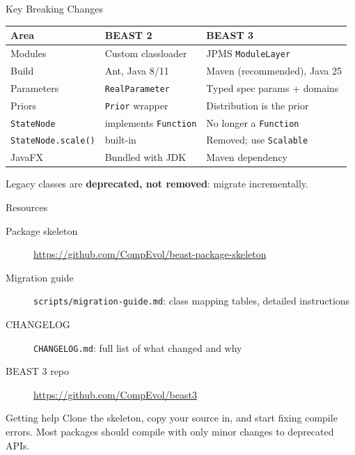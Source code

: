 \documentclass[aspectratio=169,11pt]{beamer}
\newcommand{\code}[1]{\texttt{#1}}
\begin{document}
\begin{frame}{Key Breaking Changes}
\begin{center}
\begin{tabular}{lll}
\toprule
\textbf{Area} & \textbf{BEAST 2} & \textbf{BEAST 3} \\
\midrule
Modules & Custom classloader & JPMS \code{ModuleLayer} \\
Build & Ant, Java 8/11 & Maven (recommended), Java 25 \\
Parameters & \code{RealParameter} & Typed spec params + domains \\
Priors & \code{Prior} wrapper & Distribution is the prior \\
\code{StateNode} & implements \code{Function} & No longer a \code{Function} \\
\code{StateNode.scale()} & built-in & Removed; use \code{Scalable} \\
JavaFX & Bundled with JDK & Maven dependency \\
\bottomrule
\end{tabular}
\end{center}

\vspace{0.5em}
Legacy classes are \textbf{deprecated, not removed}: migrate incrementally.
\end{frame}




\begin{frame}{Resources}
\begin{description}
\item[Package skeleton] \url{https://github.com/CompEvol/beast-package-skeleton}
\item[Migration guide] \code{scripts/migration-guide.md}: class mapping tables, detailed instructions
\item[CHANGELOG] \code{CHANGELOG.md}: full list of what changed and why
\item[BEAST 3 repo] \url{https://github.com/CompEvol/beast3}
\end{description}

\vspace{1em}
\begin{block}{Getting help}
Clone the skeleton, copy your source in, and start fixing compile errors.
Most packages should compile with only minor changes to deprecated APIs.
\end{block}
\end{frame}
\end{document}
